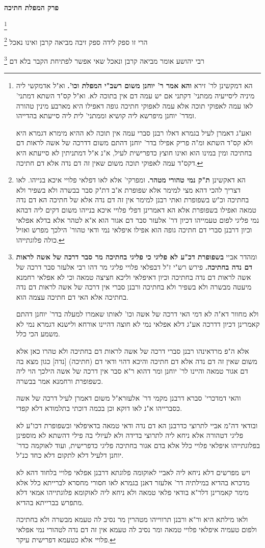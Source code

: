 \documentclass[12pt, openany]{book}
\newcommand{\sethebfont}{
\fontsize{10.5pt}{21.0pt} \selectfont
}
\newcommand{\twocol}[1]{
	{\sethebfont \begin{multicols}{2}
			#1
	\end{multicols}}	
}
\newcommand{\chapname}{}
\newcommand{\newchap}[1]{
	\addcontentsline{toc}{chapter}{#1}
	\renewcommand{\chapname}{#1}
		\begin{center}
			\textbf{%
\fontsize{16pt}{16pt}\selectfont
				#1}
		\end{center}
}
\newcommand{\footnotecomment}[1]{\footnote{#1}}
\newcommand{\commenta}[1]{\footnotecomment{#1}}
\begin{document}
\newchap{פרק  המפלת חתיכה}
\twocol{
\commenta{ הא דמקשינן לר' זירא \textbf{והא אמר ר' יוחנן משום רשב"י המפלת וכו'.}  וא"ל אדמקשי ליה מיניה ליסייעיה ממתני' דקתני אם יש עמה דם אין בתוכה לא. וא"ל קס"ד השתא דמתני' לאו עמה לאפוקי תוכה אלא עמה לאפוקי חתיכה גופה דאפילו היא מארבע מינין טהורה ומדר' יוחנן מיפרשא ליה קושיא וממתני' לית ליה סייעתא בהדייהו.\par  ואע"ג דאמרן לעיל בגמרא דאלו רבנן סברי עמה אין תוכה לא ההיא מימרא דגמרא היא ולא קס"ד השתא ומ"ה פריק אפילו בדר' יוחנן דהתם משום דדרכה של אשה לראות דם בחתיכה ומין במינו הוא ואינו חוצץ כדפרישית לעיל, א"נ א"ל דמתניתין לא סייעתא היא דקס"ד עמה לאפוקי תוכה משום שאין זה דם נדה אלא דם חתיכה. }

הרי זו ספק לידה ספק זיבה מביאה קרבן ואינו נאכל 
\commenta{ הא דאקשינן \textbf{ת"ק נמי טהורי מטהר.}  ומפרקי' אלא לאו דפלאי פלויי איכא בנייהו. לאו דצריך להכי דהא מצי למימר אלא שפופרת א"ב דת"ק סבר בבשרה ולא בשפיר ולא בחתיכה וכ"ש בשפופרת ואתי רבנן למימר אין זה דם נדה אלא של חתיכה הא דם נדה טמאה ואפילו בשפופרת אלא הא דאמרינן דפלי פלויי איכא בנייהו משום דקים ליה דבהא נמי פליגי לפום טעמייהו דכיון דר' אלעזר סבר דם אגור הוא א"א לטהר אלא בדלא אפלאי וכיון דרבנן סברי דם חתיכה גופה הוא אפילו איפלאי נמי ודאי טהור' הילכך מפרש ואזיל כולה פלוגתייהו. }

רבי יהושע אומר  מביאה קרבן ונאכל שאי אפשר לפתיחת הקבר בלא דם 
\commenta{ ומהדר אביי \textbf{בשפופרת דכ"ע לא פליגי כי פליגי בחתיכה מר סבר דרכה של אשה לראות דם נדה בחתיכה.}  פירש רש"י ז"ל דבפלאי פלויי פליגי מר דהו רבי אלעזר סבר דרכה של אשה לראות דם נדה בחתיכה וכיון דאיפלאי וליכא חציצה טמאה וכי לא אפלאי רחמנא מיעטה מבשרה ולא בשפיר ולא בחתיכה ורבנן סברי אין דרכה של אשה לראות דם נדה בחתיכה אלא האי דם חתיכה עצמה הוא.\par ולא מחוור דא"ה לא דמי האי דרכה של אשה וכו' לאותו שאמרו למעלה בדר' יוחנן דהתם קאמרינן דכיון דדרכה אע"ג דלא אפלאי נמי לא חוצה דהיינו אורחא ולישנא דגמרא נמי לא משמע הכי כלל.\par אלא ה"פ מרדאינהו רבנן סברי דרכה של אשה לראות דם בחתיכה ולא טהרו כאן אלא משום שאין זה דם נדה אלא דם חתיכה והיכא דהוי ודאי דם (חתיכה) [נדה] כגון מצא בה דם אגור טמאה והיינו לר' יוחנן ומר דהוא ר"א סבר אין דרכה של אשה הילכך הוי ליה כשפופרת ורחמנא אמר בבשרה.\par והאי דמדכרי' סברא דרבנן מקמי דר' אלעזרא"ל משום דאמרן לעיל דרכה של אשה כסברייהו א"נ לאו דוקא וכן בכמה דוכתי בתלמודא דלא קפדי.\par  ובודאי דה"מ אביי לתרוצי כדרבנן הא דם נדה ודאי טמאה בדאיפלאי ובשפופרת דכו"ע לא פליגי דטהורה אלא ניחא ליה לתרוצי בדידה ולא לעיולי בה פילי דהשתא לא מוספינן בפלוגתייהו איפלאי פלויי כלל אלא בדם אגור בחתיכה פליגי כדפרישית, ועוד לאוקמה כדר' יוחנן דלעיל דלא לתקום דלא כחד כנ"ל.\par ויש מפרשים דלא ניחא ליה לאביי לאוקומה פלוגתא דרבנן אפלאי פלויי בלחוד דהא לא מדכרא בהדיא במילתיה דר' אלעזר דאנן בגמרא לאו חסורי מחסרא לברייתא כלל אלא מימר קאמרינן דלר"א בודאי פלאי טמאה ולא ניחא ליה לאוקומא פלוגתייהו אמאי דלא מתפרש בברייתא בהדיא.\par  ולאו מילתא היא ור"א ורבנן תרווייהו מטהרין מר נסיב לה טעמא מבשרה ולא בחתיכה ולפום טעמיה איפלאי פלויי טמאה ומר נסיב לה טעמא אין זה דם נדה לטהורי נמי אפלאי פלויי אלא כטעמא דפרישית עיקר. }

}
\end{document}
